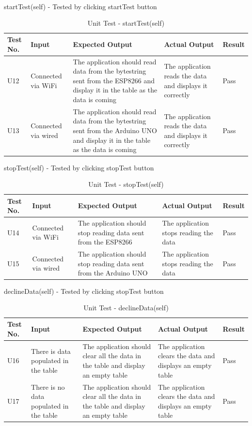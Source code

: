 \documentclass[12pt, titlepage]{article}
\begin{document}
  startTest(self) - Tested by clicking startTest button
  \begin{table}[H]
    \begin{tabular}{| p{} | p{}| p{}| p{}| p{}|}
      \hline
      \rowcolor[gray]{0.9}
      Test No. & Input & Expected Output & Actual Output & Result\\
      \hline
      U12 & Connected via WiFi & The application should read data from the bytestring sent from the ESP8266 and display it in the table as the data is coming & The application reads the data and displays it correctly & Pass \\
      \hline
      U13 & Connected via wired & The application should read data from the bytestring sent from the Arduino UNO and display it in the table as the data is coming & The application reads the data and displays it correctly & Pass \\
      \hline
    \end{tabular}
    \caption{Unit Test - startTest(self)}
    \end{table}
\newpage
  stopTest(self) - Tested by clicking stopTest button
  \begin{table}[H]
    \begin{tabular}{| p{} | p{}| p{}| p{}| p{}|}
      \hline
      \rowcolor[gray]{0.9}
      Test No. & Input & Expected Output & Actual Output & Result\\
      \hline
      U14 & Connected via WiFi & The application should stop reading data sent from the ESP8266  & The application stops reading the data & Pass \\
      \hline
      U15 & Connected via wired & The application should stop reading data sent from the Arduino UNO & The application stops reading the data & Pass \\
      \hline
    \end{tabular}
    \caption{Unit Test - stopTest(self)}
    \end{table}

  declineData(self) - Tested by clicking stopTest button
  \begin{table}[H]
    \begin{tabular}{| p{} | p{}| p{}| p{}| p{}|}
      \hline
      \rowcolor[gray]{0.9}
      Test No. & Input & Expected Output & Actual Output & Result\\
      \hline
      U16 & There is data populated in the table & The application should clear all the data in the table and display an empty table  & The application clears the data and displays an empty table & Pass \\
      \hline
      U17 & There is no data populated in the table & The application should clear all the data in the table and display an empty table  & The application clears the data and displays an empty table & Pass \\
      \hline
    \end{tabular}
    \caption{Unit Test - declineData(self)}
    \end{table}
\end{document}
